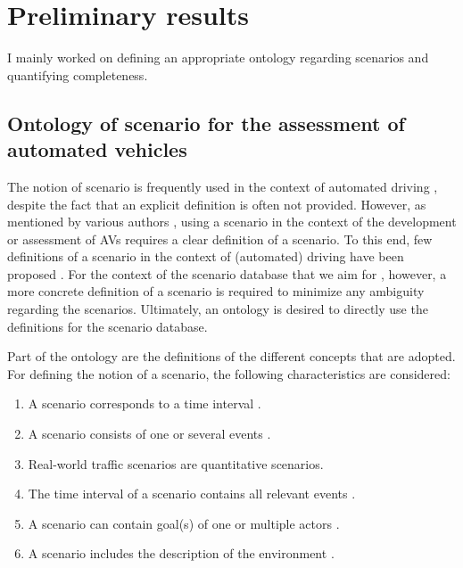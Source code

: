 \section{Preliminary results}
\label{sec:results}

I mainly worked on defining an appropriate ontology regarding scenarios and quantifying completeness. 

\subsection{Ontology of scenario for the assessment of automated vehicles}
\label{sec:ontology}

The notion of scenario is frequently used in the context of automated driving \cite{putz2017pegasus, roesener2017comprehensive, gietelink2006development, hulshof2013autonomous, karaduman2013interactivebehavior, englund2016grand, xu2002effects, ebner2011identifying, ploeg2017GCDC, zofka2015datadrivetrafficscenarios}, despite the fact that an explicit definition is often not provided. However, as mentioned by various authors \cite{stellet2015taxonomy, alvarez2017prospective, zofka2015datadrivetrafficscenarios, aparicio2013pre, lesemann2011test, putz2017pegasus, geyer2014, ulbrich2015}, using a scenario in the context of the development or assessment of AVs requires a clear definition of a scenario. To this end, few definitions of a scenario in the context of (automated) driving have been proposed \cite{geyer2014, ulbrich2015, elrofai2016scenario}. For the context of the scenario database that we aim for \cite{elrofai2018scenario}, however, a more concrete definition of a scenario is required to minimize any ambiguity regarding the scenarios. Ultimately, an ontology is desired to directly use the definitions for the scenario database.

Part of the ontology are the definitions of the different concepts that are adopted. For defining the notion of a scenario, the following characteristics are considered:
\begin{enumerate}
	\item A scenario corresponds to a time interval \cite{go2004blind, geyer2014, ulbrich2015, elrofai2016scenario}.
	\item A scenario consists of one or several events \cite{vannotten2003updated, go2004blind, geyer2014, ulbrich2015, kahn1962, englund2016grand, schoemaker1993multiple, cuppens2002alert, bach2016modelbased}.
	\item Real-world traffic scenarios are quantitative scenarios.
	\item The time interval of a scenario contains all relevant events \cite{geyer2014}.
	\item A scenario can contain goal(s) of one or multiple actors \cite{geyer2014, ulbrich2015, elrofai2016scenario}.
	\item A scenario includes the description of the environment \cite{geyer2014, ulbrich2015, elrofai2016scenario, ebner2011identifying, schuldt2013effiziente, althoff2017CommonRoad}.
\end{enumerate}

